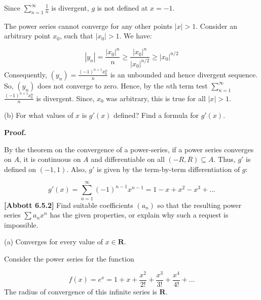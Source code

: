 \documentclass[10pt]{article}
\begin{document}
Since $\displaystyle \sum _{n=1}^{\infty }\frac{1}{n}$ is divergent, $\displaystyle g$ is not defined at $\displaystyle x=-1$. 



The power series cannot converge for any other points $\displaystyle |x| >1$. Consider an arbitrary point $\displaystyle x_{0}$, such that $\displaystyle |x_{0} | >1$. We have:


\begin{equation*}
|y_{n} |=\frac{|x_{0} |^{n}}{n} \geq \frac{|x_{0} |^{n}}{|x_{0} |^{n/2}} \geq |x_{0} |^{n/2}
\end{equation*}
Consequently, $\displaystyle ( y_{n}) =\frac{( -1)^{n+1} x_{0}^{n}}{n}$ is an unbounded and hence divergent sequence. So, $\displaystyle ( y_{n})$ does not converge to zero. Hence, by the $\displaystyle n$th term test $\displaystyle \sum _{n=1}^{\infty }$$\displaystyle \frac{( -1)^{n+1} x_{0}^{n}}{n}$ is divergent. Since, $\displaystyle x_{0}$ was arbitrary, this is true for all $\displaystyle |x| >1$.





(b) For what values of $\displaystyle x$ is $\displaystyle g'( x)$ defined? Find a formula for $\displaystyle g'( x)$. 



\textbf{Proof.}



By the theorem on the convergence of a power-series, if a power series converges on $\displaystyle A$, it is continuous on $\displaystyle A$ and differentiable on all $\displaystyle ( -R,R) \subseteq A$. Thus, $\displaystyle g'$ is defined on $\displaystyle ( -1,1)$. Also, $\displaystyle g'$ is given by the term-by-term differentiation of $\displaystyle g$:


\begin{equation*}
g'( x) =\sum _{n=1}^{\infty }( -1)^{n-1} x^{n-1} =1-x+x^{2} -x^{3} +\dotsc 
\end{equation*}
\textbf{ [Abbott 6.5.2] }Find suitable coefficients $\displaystyle ( a_{n})$ so that the resulting power series $\displaystyle \sum a_{n} x^{n}$ has the given properties, or explain why such a request is impossible.



(a) Converges for every value of $\displaystyle x\in \mathbf{R}$. 



Consider the power series for the function


\begin{equation*}
f( x) =e^{x} =1+x+\frac{x^{2}}{2!} +\frac{x^{3}}{3!} +\frac{x^{4}}{4!} +\dotsc 
\end{equation*}
The radius of convergence of this infinite series is $\displaystyle \mathbf{R}$.
\end{document}
